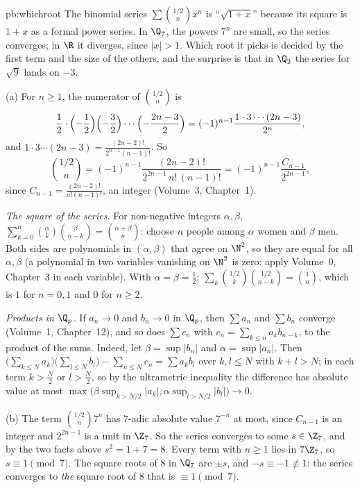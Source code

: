 \begin{solution}{pb:whichroot}
\idea The binomial series $\sum\binom{1/2}nx^n$ is ``$\sqrt{1+x}$'' because its square is $1+x$ as a formal power series. In
$\Q_7$, the powers $7^n$ are small, so the series converges; in $\R$ it diverges, since $|x|>1$. Which root it picks is decided
by the first term and the size of the others, and the surprise is that in $\Q_2$ the series for $\sqrt9$ lands on $-3$.

\writeup (a) For $n\ge1$, the numerator of $\binom{1/2}n$ is
\[
\frac12\cdot\Bigl(-\frac12\Bigr)\Bigl(-\frac32\Bigr)\cdots\Bigl(-\frac{2n-3}2\Bigr)=(-1)^{n-1}\frac{1\cdot3\cdots(2n-3)}{2^n},
\]
and $1\cdot3\cdots(2n-3)=\frac{(2n-2)!}{2^{n-1}(n-1)!}$. So
\[
\binom{1/2}n=(-1)^{n-1}\frac{(2n-2)!}{2^{2n-1}\,n!\,(n-1)!}=(-1)^{n-1}\frac{C_{n-1}}{2^{2n-1}},
\]
since $C_{n-1}=\frac{(2n-2)!}{n!(n-1)!}$, an integer (Volume~3, Chapter~1).

\emph{The square of the series.} For non-negative integers $\alpha,\beta$, $\sum_{k=0}^n\binom\alpha k\binom\beta{n-k}=
\binom{\alpha+\beta}n$: choose $n$ people among $\alpha$ women and $\beta$ men. Both sides are polynomials in $(\alpha,\beta)$
that agree on $\N^2$, so they are equal for all $\alpha,\beta$ (a polynomial in two variables vanishing on $\N^2$ is zero:
apply Volume~0, Chapter~3 in each variable). With $\alpha=\beta=\frac12$: $\sum_k\binom{1/2}k\binom{1/2}{n-k}=\binom1n$, which is
$1$ for $n=0,1$ and $0$ for $n\ge2$.

\emph{Products in $\Q_p$.} If $a_n\to0$ and $b_n\to0$ in $\Q_p$, then $\sum a_n$ and $\sum b_n$ converge (Volume~1,
Chapter~12), and so does $\sum c_n$ with $c_n=\sum_{k\le n}a_kb_{n-k}$, to the product of the sums. Indeed, let $\beta=\sup|b_n|$
and $\alpha=\sup|a_n|$. Then
$\bigl(\sum_{k\le N}a_k\bigr)\bigl(\sum_{l\le N}b_l\bigr)-\sum_{n\le N}c_n=\sum a_kb_l$ over $k,l\le N$ with $k+l>N$; in each
term $k>\frac N2$ or $l>\frac N2$, so by the ultrametric inequality the difference has absolute value at most
$\max\bigl(\beta\sup_{k>N/2}|a_k|,\alpha\sup_{l>N/2}|b_l|\bigr)\to0$.

(b) The term $\binom{1/2}n7^n$ has $7$-adic absolute value $7^{-n}$ at most, since $C_{n-1}$ is an integer and $2^{2n-1}$ is
a unit in $\Z_7$. So the series converges to some $s\in\Z_7$, and by the two facts above $s^2=1+7=8$. Every term with $n\ge1$
lies in $7\Z_7$, so $s\equiv1\pmod7$. The square roots of $8$ in $\Q_7$ are $\pm s$, and $-s\equiv-1\not\equiv1$: the series
converges to \emph{the} square root of $8$ that is $\equiv1\pmod7$.


\end{solution}
